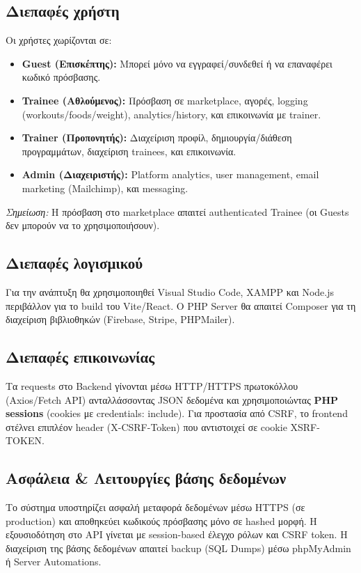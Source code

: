 \documentclass[12pt,a4paper]{report}
\begin{document}
\subsection{Διεπαφές χρήστη}
Οι χρήστες χωρίζονται σε:
\begin{itemize}[label=•]
    \item \textbf{Guest (Επισκέπτης):} Μπορεί μόνο να εγγραφεί/συνδεθεί ή να επαναφέρει κωδικό πρόσβασης.
    \item \textbf{Trainee (Αθλούμενος):} Πρόσβαση σε marketplace, αγορές, logging (workouts/foods/weight), analytics/history, και επικοινωνία με trainer.
    \item \textbf{Trainer (Προπονητής):} Διαχείριση προφίλ, δημιουργία/διάθεση προγραμμάτων, διαχείριση trainees, και επικοινωνία.
    \item \textbf{Admin (Διαχειριστής):} Platform analytics, user management, email marketing (Mailchimp), και messaging.
\end{itemize}
\textit{Σημείωση:} Η πρόσβαση στο marketplace απαιτεί authenticated Trainee (οι Guests δεν μπορούν να το χρησιμοποιήσουν).

\subsection{Διεπαφές λογισμικού}
Για την ανάπτυξη θα χρησιμοποιηθεί Visual Studio Code, XAMPP και Node.js περιβάλλον για το build του Vite/React. Ο PHP Server θα απαιτεί \textenglish{Composer} για τη διαχείριση βιβλιοθηκών (Firebase, Stripe, PHPMailer).

\subsection{Διεπαφές επικοινωνίας}
Τα requests στο Backend γίνονται μέσω HTTP/HTTPS πρωτοκόλλου (Axios/Fetch API) ανταλλάσσοντας JSON δεδομένα και χρησιμοποιώντας \textbf{PHP sessions} (cookies με \textenglish{credentials: include}). Για προστασία από CSRF, το frontend στέλνει επιπλέον header (\textenglish{X-CSRF-Token}) που αντιστοιχεί σε cookie \textenglish{XSRF-TOKEN}.

\subsection{Ασφάλεια \& Λειτουργίες βάσης δεδομένων}
Το σύστημα υποστηρίζει ασφαλή μεταφορά δεδομένων μέσω HTTPS (σε production) και αποθηκεύει κωδικούς πρόσβασης μόνο σε hashed μορφή. Η εξουσιοδότηση στο API γίνεται με session-based έλεγχο ρόλων και CSRF token. Η διαχείριση της βάσης δεδομένων απαιτεί backup (SQL Dumps) μέσω phpMyAdmin ή Server Automations.
\end{document}
